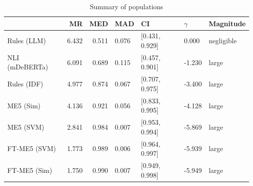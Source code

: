 \begin{table}[h]
\centering
\begin{tabular}{lrrllll}
\toprule
 & MR & MED & MAD & CI & $\gamma$ & Magnitude \\
\midrule
Rules (LLM) & 6.432 & 0.511 & 0.076 & [0.431, 0.929] & 0.000 & negligible \\
NLI (mDeBERTa) & 6.091 & 0.689 & 0.115 & [0.457, 0.901] & -1.230 & large \\
Rules (IDF) & 4.977 & 0.874 & 0.067 & [0.707, 0.975] & -3.400 & large \\
ME5 (Sim) & 4.136 & 0.921 & 0.056 & [0.833, 0.995] & -4.128 & large \\
ME5 (SVM) & 2.841 & 0.984 & 0.007 & [0.953, 0.994] & -5.869 & large \\
FT-ME5 (SVM) & 1.773 & 0.989 & 0.006 & [0.964, 0.997] & -5.939 & large \\
FT-ME5 (Sim) & 1.750 & 0.990 & 0.007 & [0.949, 0.998] & -5.949 & large \\
\bottomrule
\end{tabular}
\caption{Summary of populations}
\label{tbl:stat_results}
\end{table}
